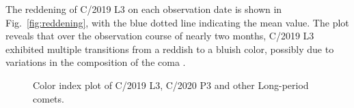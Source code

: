 The reddening of C/2019 L3 on each observation date is shown in Fig.~\ref{fig:reddening}, with the blue dotted line indicating the mean value. The plot reveals that over the observation course of nearly two months, C/2019 L3 exhibited multiple transitions from a reddish to a bluish color, possibly due to variations in the composition of the coma \citep{ivanova_colour_2017}.


\begin{figure}
    \centering
   
    \caption{Color index plot of C/2019 L3, C/2020 P3 and other Long-period comets. }\label{fig:color_index}
\end{figure}


